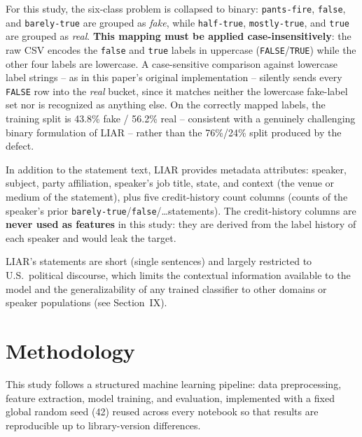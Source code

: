 \documentclass[conference]{IEEEtran}
\begin{document}
For this study, the six-class problem is collapsed to binary: \texttt{pants-fire},
\texttt{false}, and \texttt{barely-true} are grouped as \emph{fake}, while
\texttt{half-true}, \texttt{mostly-true}, and \texttt{true} are grouped as
\emph{real}. \textbf{This mapping must be applied case-insensitively}: the raw CSV
encodes the \texttt{false} and \texttt{true} labels in uppercase
(\texttt{FALSE}/\texttt{TRUE}) while the other four labels are lowercase. A
case-sensitive comparison against lowercase label strings -- as in this paper's
original implementation -- silently sends every \texttt{FALSE} row into the
\emph{real} bucket, since it matches neither the lowercase fake-label set nor is
recognized as anything else. On the correctly mapped labels, the training split is
43.8\% fake / 56.2\% real -- consistent with a genuinely challenging binary
formulation of LIAR -- rather than the 76\%/24\% split produced by the defect.

In addition to the statement text, LIAR provides metadata attributes: speaker,
subject, party affiliation, speaker's job title, state, and context (the venue or
medium of the statement), plus five credit-history count columns (counts of the
speaker's prior \texttt{barely-true}/\texttt{false}/\ldots statements). The
credit-history columns are \textbf{never used as features} in this study: they are
derived from the label history of each speaker and would leak the target.

LIAR's statements are short (single sentences) and largely restricted to U.S.\
political discourse, which limits the contextual information available to the
model and the generalizability of any trained classifier to other domains or
speaker populations (see Section~IX).

\section{Methodology}
This study follows a structured machine learning pipeline: data preprocessing,
feature extraction, model training, and evaluation, implemented with a fixed
global random seed (42) reused across every notebook so that results are
reproducible up to library-version differences.
\end{document}
